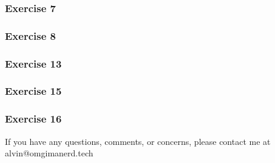 \documentclass{math}
\begin{document}
\subsubsection*{Exercise 7}
\subsubsection*{Exercise 8}
\subsubsection*{Exercise 13}
\subsubsection*{Exercise 15}
\subsubsection*{Exercise 16}

\begin{center}
  If you have any questions, comments, or concerns, please contact me at
  alvin@omgimanerd.tech
\end{center}
\end{document}
